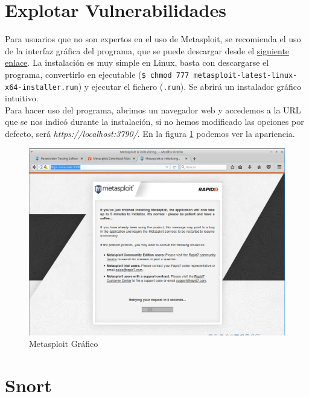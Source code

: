 \documentclass[a4,12pt,onecolum]{article}
\begin{document}

\clearpage
\section{Explotar Vulnerabilidades}

Para usuarios que no son expertos en el uso de Metasploit, se recomienda el uso de la interfaz gráfica del programa, que se puede descargar desde el \href{https://www.rapid7.com/products/metasploit/download/}{siguiente enlace}. La instalación es muy simple en Linux, basta con descargarse el programa, convertirlo en ejecutable (\texttt{\$ chmod 777 metasploit-latest-linux-x64-installer.run}) y ejecutar el fichero (\texttt{.run}). Se abrirá un instalador gráfico intuitivo. \\

Para hacer uso del programa, abrimos un navegador web y accedemos a la URL que se nos indicó durante la instalación, si no hemos modificado las opciones por defecto, será \emph{https://localhost:3790/}. En la figura \ref{fig:meta3} podemos ver la apariencia.

\begin{figure}[htbp]
\centering
\includegraphics[width=1.0\textwidth]{./images/Atacante_metasploit_grafico.png}
\caption{Metasploit Gráfico}
\label{fig:meta3}
\end{figure}


\clearpage
\section{Snort}
\end{document}
